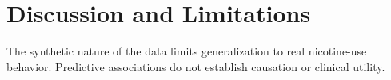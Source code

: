 \section{Discussion and Limitations}
The synthetic nature of the data limits generalization to real nicotine-use
behavior. Predictive associations do not establish causation or clinical utility.

